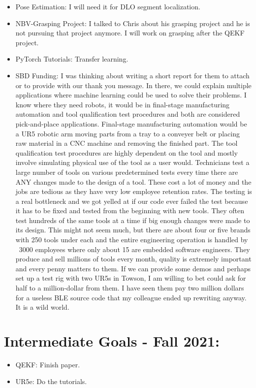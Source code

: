 \documentclass[11pt]{article}
\begin{document}
\begin{itemize}
    \item Pose Estimation: I will need it for DLO segment localization.
    \item NBV-Grasping Project: I talked to Chris about his grasping project
    and he is not pursuing that project anymore. I will work on grasping after
    the QEKF project.
    \item PyTorch Tutorials: Transfer learning.
    \item SBD Funding: I was thinking about writing a short report for them to
    attach or to provide with our thank you message. In there, we could explain
    multiple applications where machine learning could be used to solve their
    problems. I know where they need robots, it would be in final-stage
    manufacturing automation and tool qualification test procedures and both
    are considered pick-and-place applications. Final-stage
    manufacturing automation would be a UR5 robotic arm moving parts from a
    tray to a conveyer belt or placing raw material in a CNC machine and
    removing the finished part. The tool qualification test procedures are
    highly dependent on the tool and mostly involve simulating physical use of
    the tool as a user would. Technicians test a large number of tools on
    various predetermined tests every time there are ANY changes made to the
    design of a tool. These cost a lot of money and the jobs are tedious as
    they have very low employee retention rates. The testing is a real
    bottleneck and we got yelled at if our code ever failed the test because
    it has to be fixed and tested from the beginning with new tools. They often
    test hundreds of the same tools at a time if big enough changes were
    made to its design. This might
    not seem much, but there are about four or five brands with 250 tools under
    each and the entire engineering operation is handled by ~3000 employees
    where only about 15 are embedded software engineers.
    They produce and sell millions of tools every month, quality is extremely
    important and every penny matters to them.
    If we can provide some demos and perhaps set up
    a test rig with two UR5s in Towson, I am willing to bet could ask for
    half to a million-dollar from them. I have seen them pay two million dollars
    for a useless BLE source code that my colleague ended up rewriting anyway.
    It is a wild world.
  \end{itemize}

\section{Intermediate Goals - Fall 2021:}
\begin{itemize}
      \item QEKF: Finish paper.
      \item UR5e: Do the tutorials.
\end{itemize}

\newpage

\newpage


\end{document}
